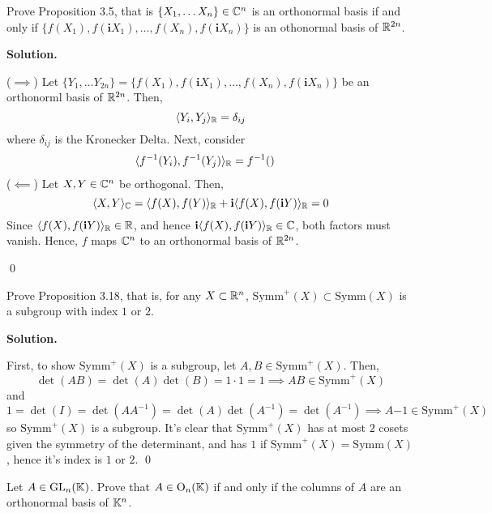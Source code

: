 \documentclass[12pt]{book}
\theoremstyle{definition}
\newenvironment{solution}
{%
  \par\noindent\textbf{Solution.}\quad
}
{%
  \qed\par
}
\begin{document}
\begin{taggedexercise}[WIP]
  Prove Proposition 3.5, that is $\{X_1, \dots X_n\} \in \mathbb{C}^n$ is an orthonormal basis if and only if $\{f(X_1), f(\mathbf{i}X_1), \dots ,f(X_n), f(\mathbf{i}X_n)\}$ is an othonormal basis of $\mathbb{R}^{2n}$. 
\end{taggedexercise}

\begin{solution}
  ($\implies$) Let $\{Y_1, \dots Y_{2n}\} = \{f(X_1), f(\mathbf{i}X_1), \dots ,f(X_n), f(\mathbf{i}X_n)\}$ be an orthonorml basis of $\mathbb{R}^{2n}$.
  Then,
  \[
  \langle Y_i, Y_j \rangle_{\mathbb{R}} = \delta_{ij}
  \]
  where $\delta_{ij}$ is the Kronecker Delta.
  Next, consider
  \[
  \begin{aligned}
    \langle f^{-1}(Y_i), f^{-1}(Y_j) \rangle_{\mathbb{R}} &= f^{-1}()
  \end{aligned}
  \]
  ($\impliedby$) Let $X, Y \in \mathbb{C}^n$ be orthogonal.
  Then,
  \[
  \langle X, Y \rangle_{\mathbb{C}} = \langle f(X), f(Y) \rangle_{\mathbb{R}} + \mathbf{i} \langle f(X), f(\mathbf{i}Y) \rangle_{\mathbb{R}} = 0
  \]
  Since $\langle f(X), f(\mathbf{i}Y) \rangle_{\mathbb{R}} \in \mathbb{R}$, and hence $\mathbf{i}\langle f(X), f(\mathbf{i}Y) \rangle_{\mathbb{R}} \in \mathbb{C}$, both factors must vanish.
  Hence, $f$ maps $\mathbb{C}^n$ to an orthonormal basis of $\mathbb{R}^{2n}$.

\end{solution}


\begin{taggedexercise}[Complete]
  Prove Proposition 3.18, that is, for any $X \subset \mathbb{R}^n$, $\text{Symm}^+(X) \subset \text{Symm}(X)$ is a subgroup with index $1$ or $2$.
\end{taggedexercise}

\begin{solution}
  First, to show $\text{Symm}^+(X)$ is a subgroup, let $A, B \in \text{Symm}^+(X)$. 
  Then,
  \[
  \det(AB) = \det(A)\det(B) = 1 \cdot 1 = 1 \implies AB \in \text{Symm}^+(X)
  \]
  and
  \[
  1 = \det(I) = \det(AA^{-1}) = \det(A)\det(A^{-1}) = \det(A^{-1}) \implies A{-1} \in \text{Symm}^+(X)
  \]
  so $\text{Symm}^+(X)$ is a subgroup. 
  It's clear that $\text{Symm}^+(X)$ has at most $2$ cosets given the symmetry of the determinant, and has $1$ if $\text{Symm}^+(X) = \text{Symm}(X)$, hence it's index is $1$ or $2$.
\end{solution}

\begin{taggedexercise}[Complete]
  Let $A \in \mathrm{GL}_{n}(\mathbb{K})$. Prove that $A \in \text{O}_n(\mathbb{K})$ if and only if the columns of $A$ are an orthonormal basis of $\mathbb{K}^n$.
\end{taggedexercise}
\end{document}
